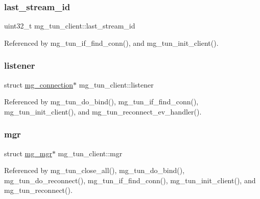 \subsubsection{\texorpdfstring{last\+\_\+stream\+\_\+id}{last\_stream\_id}}
{\footnotesize\ttfamily uint32\+\_\+t mg\+\_\+tun\+\_\+client\+::last\+\_\+stream\+\_\+id}



Referenced by mg\+\_\+tun\+\_\+if\+\_\+find\+\_\+conn(), and mg\+\_\+tun\+\_\+init\+\_\+client().

\mbox{\label{structmg__tun__client_a023920ae1a96f98f546ea70df7d710df_a023920ae1a96f98f546ea70df7d710df}} 
\subsubsection{\texorpdfstring{listener}{listener}}
{\footnotesize\ttfamily struct \hyperlink{structmg__connection}{mg\+\_\+connection}$\ast$ mg\+\_\+tun\+\_\+client\+::listener}



Referenced by mg\+\_\+tun\+\_\+do\+\_\+bind(), mg\+\_\+tun\+\_\+if\+\_\+find\+\_\+conn(), mg\+\_\+tun\+\_\+init\+\_\+client(), and mg\+\_\+tun\+\_\+reconnect\+\_\+ev\+\_\+handler().

\mbox{\label{structmg__tun__client_a6d8252150b0c44c00f00d2e5ef20d88b_a6d8252150b0c44c00f00d2e5ef20d88b}} 
\subsubsection{\texorpdfstring{mgr}{mgr}}
{\footnotesize\ttfamily struct \hyperlink{structmg__mgr}{mg\+\_\+mgr}$\ast$ mg\+\_\+tun\+\_\+client\+::mgr}



Referenced by mg\+\_\+tun\+\_\+close\+\_\+all(), mg\+\_\+tun\+\_\+do\+\_\+bind(), mg\+\_\+tun\+\_\+do\+\_\+reconnect(), mg\+\_\+tun\+\_\+if\+\_\+find\+\_\+conn(), mg\+\_\+tun\+\_\+init\+\_\+client(), and mg\+\_\+tun\+\_\+reconnect().

\mbox{\label{structmg__tun__client_a49657c0a96dc128f11dc2d7658bfd06b_a49657c0a96dc128f11dc2d7658bfd06b}} 
